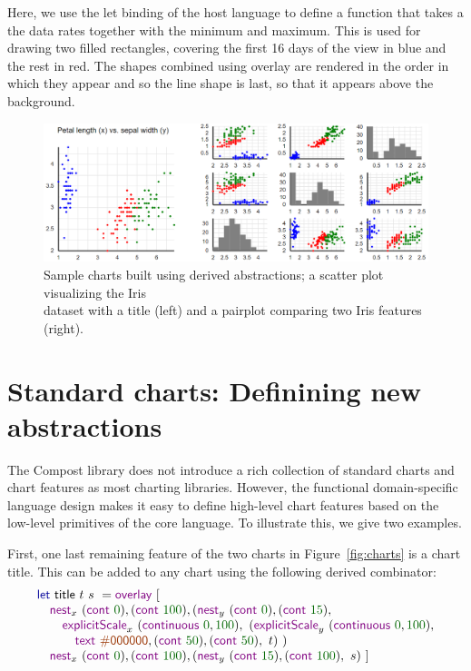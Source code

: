 \documentclass{jfp}
\newcommand{\num}[1]{\textcolor{numclr}{#1}}
\newcommand{\strf}[1]{\textnormal{\textcolor{strclr}{\sffamily #1}}}
\newcommand{\ident}[1]{\textnormal{\textcolor{idclr}{\sffamily #1}}}
\newcommand{\kvd}[1]{\textnormal{\textcolor{kvdclr}{\sffamily #1}}}
\newcommand{\fkvd}[1]{\textnormal{\textcolor{fkvdclr}{\sffamily #1}}}
\begin{document}
\noindent
Here, we use the \fkvd{let} binding of the host language to define a function that takes
a the data \ident{rates} together with the minimum and maximum. This is used for drawing
two filled rectangles, covering the first 16 days of the view in blue and the rest in red.
The shapes combined using \kvd{overlay} are rendered in the order in which they appear and so
the line shape is last, so that it appears above the background.

\begin{figure}
  \includegraphics[scale=0.57]{figures/standard}
  \vspace{0.25em}
  \caption{Sample charts built using derived abstractions; a scatter plot visualizing the Iris\\
    dataset with a title (left) and a pairplot comparing two Iris features (right).}
  \label{fig:standard}
\end{figure}

\section{Standard charts: Definining new abstractions}
\label{sec:abstractions}

The Compost library does not introduce a rich collection of standard charts and chart features
as most charting libraries. However, the functional domain-specific language design makes
it easy to define high-level chart features based on the low-level primitives of the core language.
To illustrate this, we give two examples.

First, one last remaining feature of the two charts in Figure~\ref{fig:charts} is a chart title.
This can be added to any chart using the following derived combinator:
%
\begin{equation*}
\begin{array}{l}
\fkvd{let}~\ident{title}~t~s~=\kvd{overlay}~[\\
\quad \kvd{nest}_x~(\kvd{cont}~\num{0}), (\kvd{cont}~\num{100}),
  (\kvd{nest}_y~(\kvd{cont}~\num{0}), (\kvd{cont}~\num{15}), \\
\quad\quad \kvd{explicitScale}_x~(\kvd{continuous}~\num{0},\num{100}),~(\kvd{explicitScale}_y~(\kvd{continuous}~\num{0},\num{100}),\\
\quad\qquad \kvd{text}~\strf{\#000000}, (\kvd{cont}~\num{50}), (\kvd{cont}~\num{50}),~t)~)\\
\quad \kvd{nest}_x~(\kvd{cont}~\num{0}), (\kvd{cont}~\num{100}),
  (\kvd{nest}_y~(\kvd{cont}~\num{15}), (\kvd{cont}~\num{100}),~s)~]
\end{array}
\end{equation*}
\end{document}
